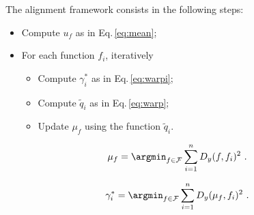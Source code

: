 The alignment framework consists in the following steps:

\begin{itemize}
  \item Compute $u_f$ as in Eq.\,\ref{eq:mean};
  \item For each function $f_i$, iteratively
    \begin{itemize}
      \item Compute $\gamma_{i}^{*}$ as in Eq.\,\ref{eq:warpi};
      \item Compute $\tilde{q}_i$ as in Eq.\,\ref{eq:warp};
      \item Update $\mu_f$ using the function $\tilde{q}_i$.
    \end{itemize}
\end{itemize}

\begin{equation}
  \mu_f = \argmin_{f \in \mathcal{F}} \sum_{i = 1}^{n} D_y(f, f_i)^2 \ .
  \label{eq:mean}
\end{equation}

\begin{equation}
  \gamma_{i}^{*} = \argmin_{f \in \mathcal{F}} \sum_{i = 1}^{n} D_y(\mu_f, f_i)^2 \ .
  \label{eq:warpi}
\end{equation}


